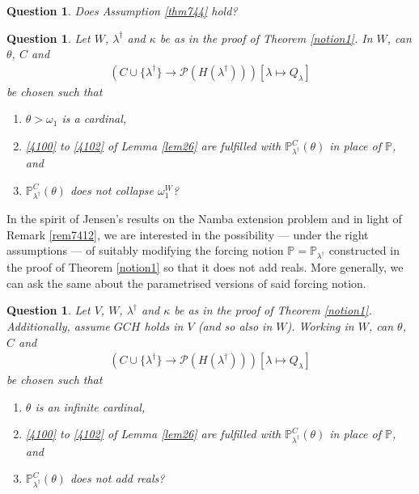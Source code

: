 \documentclass[12pt, twoside]{memoir}
\numberwithin{equation}{section}
\newtheorem{ques}[thm]{Question}
\theoremstyle{definition}
\theoremstyle{remark}
\theoremstyle{definition}
\theoremstyle{definition}
\theoremstyle{definition}
\theoremstyle{remark}
\begin{document}
\begin{ques}
Does Assumption \ref{thm744} hold?
\end{ques}

\begin{ques}\label{oq1}
Let $W$, $\lambda^{\dagger}$ and $\kappa$ be as in the proof of Theorem \ref{notion1}. In $W$, can $\theta$, $C$ and
\begin{gather*}
    (C \cup \{\lambda^{\dagger}\} \longrightarrow \mathcal{P}(H(\lambda^{\dagger}))) [\lambda \mapsto Q_{\lambda}]
\end{gather*}
be chosen such that 
\begin{enumerate}[label=(\arabic*)]
    \item $\theta > \omega_1$ is a cardinal,
    \item \ref{4100} to \ref{4102} of Lemma \ref{lem26} are fulfilled with $\mathbb{P}^C_{\lambda^{\dagger}}(\theta)$ in place of $\mathbb{P}$, and
    \item $\mathbb{P}^C_{\lambda^{\dagger}}(\theta)$ does not collapse $\omega_1^W$?
\end{enumerate}
\end{ques}

In the spirit of Jensen's results on the Namba extension problem and in light of Remark \ref{rem7412}, we are interested in the possibility --- under the right assumptions --- of suitably modifying the forcing notion $\mathbb{P} = \mathbb{P}_{\lambda^{\dagger}}$ constructed in the proof of Theorem \ref{notion1} so that it does not add reals. More generally, we can ask the same about the parametrised versions of said forcing notion. 

\begin{ques}\label{addsreals}
Let $V$, $W$, $\lambda^{\dagger}$ and $\kappa$ be as in the proof of Theorem \ref{notion1}. Additionally, assume $GCH$ holds in $V$ (and so also in $W$). Working in $W$, can $\theta$, $C$ and
\begin{gather*}
    (C \cup \{\lambda^{\dagger}\} \longrightarrow \mathcal{P}(H(\lambda^{\dagger}))) [\lambda \mapsto Q_{\lambda}]
\end{gather*}
be chosen such that
\begin{enumerate}[label=(\arabic*)]
    \item $\theta$ is an infinite cardinal,
    \item \ref{4100} to \ref{4102} of Lemma \ref{lem26} are fulfilled with $\mathbb{P}^C_{\lambda^{\dagger}}(\theta)$ in place of $\mathbb{P}$, and
    \item $\mathbb{P}^C_{\lambda^{\dagger}}(\theta)$ does not add reals?
\end{enumerate}
\end{ques}
\end{document}
